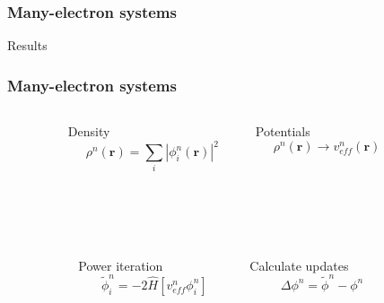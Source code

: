 \documentclass[mathserif, 10pt]{beamer}
\begin{document}
\begin{frame}
    \frametitle{Many-electron systems}
    Results
\end{frame}

\begin{frame}
    \frametitle{Many-electron systems}
    \begin{columns}
    \begin{column}[b]{0.1\textwidth}
    \ \\
    \end{column}
    \begin{column}[b]{0.4\textwidth}
    \centering
    Density
    \begin{equation}
	\nonumber
	\rho^n(\boldsymbol{r}) = \sum_i |\phi_i^n(\boldsymbol{r})|^2
    \end{equation}
    \end{column}
    \begin{column}[b]{0.4\textwidth}
    \centering
    Potentials
    \begin{equation}   
	\nonumber
	\rho^n(\boldsymbol{r}) \rightarrow v_{eff}^n(\boldsymbol{r})
    \end{equation}
    \end{column}
    \begin{column}[b]{0.1\textwidth}
    \ \\
    \end{column}
    \end{columns}
    \ \\
    \ \\
    \begin{columns}
    \begin{column}[b]{0.1\textwidth}
    \ \\
    \end{column}
    \begin{column}[b]{0.4\textwidth}
    \centering
    Power iteration
    \begin{equation}
	\nonumber
	\tilde{\phi}_i^n = -2\hat{H}\left[v_{eff}^n\phi_i^n\right]
    \end{equation}
    \end{column}
    \begin{column}[b]{0.4\textwidth}
    \centering
    Calculate updates
    \begin{equation}
	\nonumber
	\Delta\phi^n = \tilde{\phi}^n - \phi^n
    \end{equation}
    \end{column}
    \begin{column}[b]{0.1\textwidth}

\end{column}
\end{columns}
\end{frame}
\end{document}
